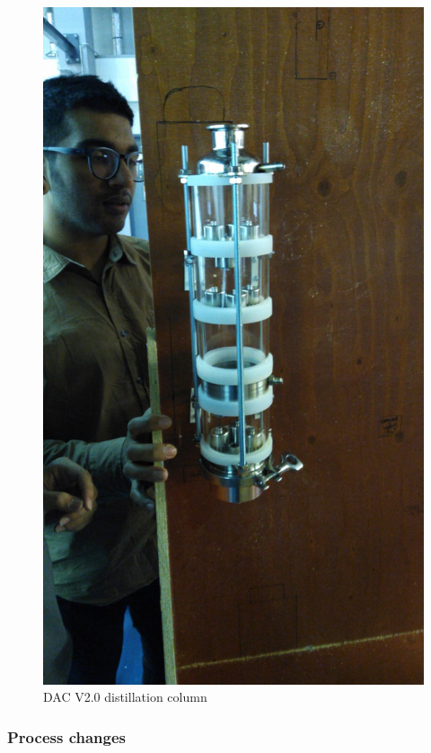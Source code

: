 \begin{itemize}
    \begin{figure}[H]
        \centering
        \includegraphics[scale = 0.25]{images/mywork/Sprint5/discol.jpg}
        \caption{DAC V2.0 distillation column}
        \label{fig:discol}
    \end{figure}

\end{itemize} 

\subsubsection{Process changes}

